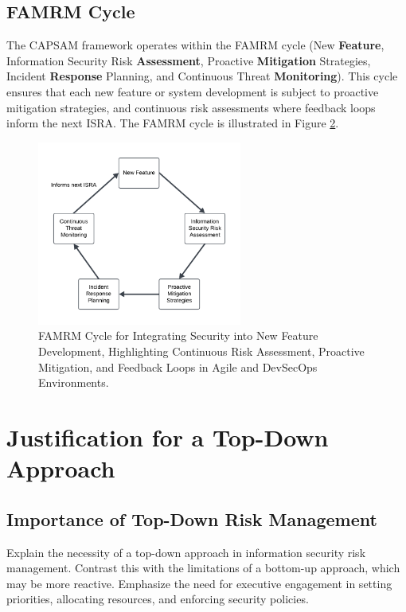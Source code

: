     \begin{figure}[htbp]
        \centering
        \caption{}
        \label{fig:CAPSAM}
    \end{figure}

    \subsection{FAMRM Cycle}
    The CAPSAM framework operates within the FAMRM cycle (New \textbf{Feature}, Information Security Risk \textbf{Assessment}, Proactive \textbf{Mitigation} Strategies, Incident \textbf{Response} Planning, and Continuous Threat \textbf{Monitoring}). This cycle ensures that each new feature or system development is subject to proactive mitigation strategies, and continuous risk assessments where feedback loops inform the next ISRA. The FAMRM cycle is illustrated in Figure \ref{fig:FAMRM}.

    \begin{figure}[htbp]
        \centering
        \includegraphics[width=0.6\textwidth]{figures/FAMRM-Cycle.png}
        \caption{FAMRM Cycle for Integrating Security into New Feature Development, Highlighting Continuous Risk Assessment, Proactive Mitigation, and Feedback Loops in Agile and DevSecOps Environments.}
        \label{fig:FAMRM}
    \end{figure}

\section{Justification for a Top-Down Approach}
    \subsection{Importance of Top-Down Risk Management}
    Explain the necessity of a top-down approach in information security risk management. Contrast this with the limitations of a bottom-up approach, which may be more reactive. Emphasize the need for executive engagement in setting priorities, allocating resources, and enforcing security policies.

